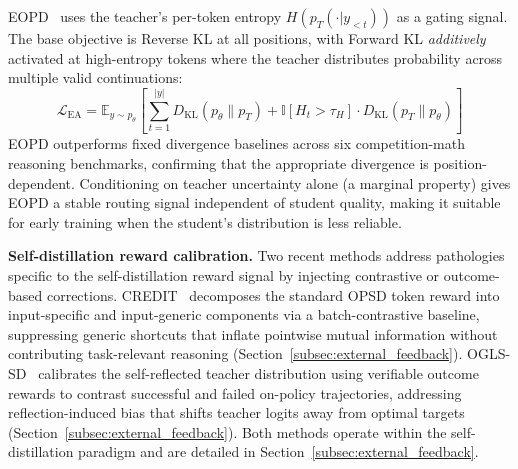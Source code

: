 \documentclass{article} %
\newcommand{\E}{\mathbb{E}}
\newcommand{\KL}{D_{\mathrm{KL}}}
\newcommand{\ptheta}{p_\theta}
\newcommand{\pteacher}{p_T}
\newcommand{\loss}{\mathcal{L}}
\begin{document}
EOPD~\citep{2603.07079} uses the teacher's per-token entropy $H(\pteacher(\cdot|y_{<t}))$ as a gating signal. The base objective is Reverse KL at all positions, with Forward KL \emph{additively} activated at high-entropy tokens where the teacher distributes probability across multiple valid continuations:
\begin{equation*}
    \loss_{\text{EA}} = \E_{y \sim \ptheta} \left[ \sum_{t=1}^{|y|} \KL(\ptheta \parallel \pteacher) + \mathbb{I}[H_t > \tau_H] \cdot \KL(\pteacher \parallel \ptheta) \right]
\end{equation*}
EOPD outperforms fixed divergence baselines across six competition-math reasoning benchmarks, confirming that the appropriate divergence is position-dependent. Conditioning on teacher uncertainty alone (a marginal property) gives EOPD a stable routing signal independent of student quality, making it suitable for early training when the student's distribution is less reliable.

\textbf{Self-distillation reward calibration.} Two recent methods address pathologies specific to the self-distillation reward signal by injecting contrastive or outcome-based corrections. CREDIT~\citep{2605.11613} decomposes the standard OPSD token reward into input-specific and input-generic components via a batch-contrastive baseline, suppressing generic shortcuts that inflate pointwise mutual information without contributing task-relevant reasoning (Section~\ref{subsec:external_feedback}). OGLS-SD~\citep{2605.12400} calibrates the self-reflected teacher distribution using verifiable outcome rewards to contrast successful and failed on-policy trajectories, addressing reflection-induced bias that shifts teacher logits away from optimal targets (Section~\ref{subsec:external_feedback}). Both methods operate within the self-distillation paradigm and are detailed in Section~\ref{subsec:external_feedback}.
\end{document}
